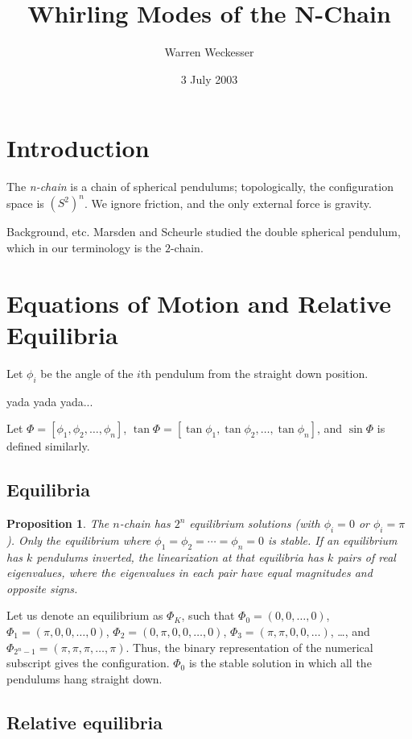 \documentclass[11pt]{amsart}
\title{Whirling Modes of the N-Chain}
\author{Warren Weckesser}
\date{3 July 2003}
\newtheorem{prop}{Proposition}
\begin{document}
\maketitle
\section{Introduction}
The \emph{n-chain} is a chain of spherical pendulums; topologically, the configuration
space is $(S^2)^{n}$.
We ignore friction, and
the only external force is gravity.

Background, etc.
Marsden and Scheurle \cite{MS} studied the double spherical pendulum, which in our terminology
is the $2$-chain.

\section{Equations of Motion and Relative Equilibria}

Let $\phi_i$ be the angle of the $i$th pendulum from the straight down position.

yada yada yada...



Let $\Phi = [\phi_1, \phi_2, \ldots, \phi_n]$,
$\tan\Phi = [\tan\phi_1, \tan\phi_2, \ldots, \tan\phi_n]$,
and $\sin\Phi$ is defined similarly.

\subsection{Equilibria}
\begin{prop}
The $n$-chain has $2^n$ equilibrium solutions
(with $\phi_i=0$ or $\phi_i = \pi$).
Only the equilibrium where $\phi_1 = \phi_2 = \cdots = \phi_n = 0$ is stable.
If an equilibrium has $k$ pendulums inverted, the linearization at that
equilibria has $k$ pairs of real eigenvalues, where the eigenvalues in each
pair have equal magnitudes and opposite signs.
\end{prop}
Let us denote an equilibrium as $\Phi_K$, such that
$\Phi_0 = (0,0,\ldots,0)$,
$\Phi_1 = (\pi,0,0,\ldots,0)$,
$\Phi_2 = (0,\pi,0,0,\ldots,0)$,
$\Phi_3 = (\pi,\pi,0,0,\ldots)$,
\ldots, and
$\Phi_{2^n-1} = (\pi,\pi,\pi,\ldots,\pi)$.
Thus, the binary representation of the numerical subscript
gives the configuration.  $\Phi_0$ is the stable solution in which all the
pendulums hang straight down.

\subsection{Relative equilibria}
\end{document}
